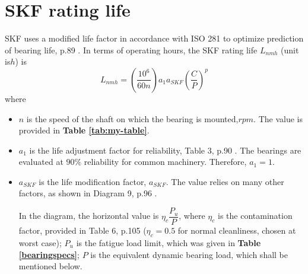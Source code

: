 \section{SKF rating life}
SKF uses a modified life factor in accordance with ISO 281 to optimize prediction of bearing life, p.89 \cite{rolling_bearings}. In terms of operating hours, the SKF rating life $ L_{nmh} $ (unit is$ \unit{h} $) is
\[L_{nmh} = \left(\dfrac{10^6}{60n}\right) a_1 a_{SKF} \left(\dfrac{C}{P}\right)^p\]
where
\begin{itemize}
	\item $ n $ is the speed of the shaft on which the bearing is mounted,$ \unit{rpm} $. The value is provided in \textbf{Table \ref{tab:my-table}}.
	\item $ a_1 $ is the life adjustment factor for reliability, Table 3, p.90 \cite{rolling_bearings}. The bearings are evaluated at $ 90\% $ reliability for common machinery. Therefore, $ a_1 = 1 $.
	\item $ a_{SKF} $ is the life modification factor, $ a_{SKF} $. The value relies on many other factors, as shown in Diagram 9, p.96 \cite{rolling_bearings}.
	
	In the diagram, the horizontal value is $ \eta_c \dfrac{P_u}{P} $, where $ \eta_c $ is the contamination factor, provided in Table 6, p.105 \cite{rolling_bearings} ($ \eta_c = 0.5 $ for normal cleanliness, chosen at worst case); $ P_u $ is the fatigue load limit, which was given in \textbf{Table \ref{bearingspecs}}; $ P $ is the equivalent dynamic bearing load, which shall be mentioned below. 
	

\end{itemize}
